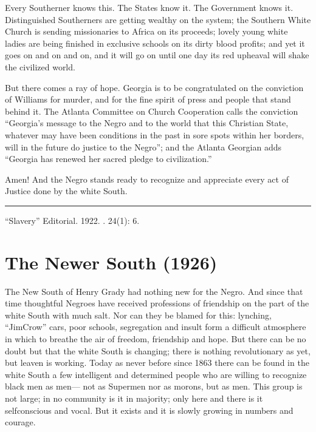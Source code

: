 \documentclass[letterpaper,10pt,english]{jupyterBook}
\begin{document}
\sphinxAtStartPar
Every Southerner knows this. The States know it. The Government knows it. Distinguished Southerners are getting wealthy on the system; the Southern White Church is sending missionaries to Africa on its proceeds; lovely young white ladies are being finished in exclusive schools on its dirty blood profits; and yet it goes on and on and on, and it will go on until one day its red upheaval will shake the civilized world.

\sphinxAtStartPar
But there comes a ray of hope. Georgia is to be congratulated on the conviction of Williams for murder, and for the fine spirit of press and people that stand behind it. The Atlanta Committee on Church Cooperation calls the conviction “Georgia’s message to the Negro and to the world that this Christian State, whatever may have been conditions in the past in sore spots within her borders, will in the future do justice to the Negro”; and the Atlanta Georgian adds “Georgia has renewed her sacred pledge to civilization.”

\sphinxAtStartPar
Amen! And the Negro stands ready to recognize and appreciate every act of Justice done by the white South.


\bigskip\hrule\bigskip


\sphinxAtStartPar
{} “Slavery” Editorial. 1922. . 24(1): 6.


\section{The Newer South (1926)}
\label{\detokenize{Volumes/31/04/newer_south:the-newer-south-1926}}\label{\detokenize{Volumes/31/04/newer_south::doc}}
\sphinxAtStartPar
The New South of Henry Grady had nothing new for the Negro. And since that time thoughtful Negroes have received professions of friendship on the part of the white South with much salt. Nor can they be blamed for this: lynching, “Jim\sphinxhyphen{}Crow” cars, poor schools, segregation and insult form a difficult atmosphere in which to breathe the air of freedom, friendship and hope. But there can be no doubt but that the white South is changing; there is nothing revolutionary as yet, but leaven is working. Today as never before since 1863 there can be found in the white South a few intelligent and determined people who are willing to recognize black men as men— not as Super\sphinxhyphen{}men nor as morons, but as men. This group is not large; in no community is it in majority; only here and there is it self\sphinxhyphen{}conscious and vocal. But it exists and it is slowly growing in numbers and courage.
\end{document}
